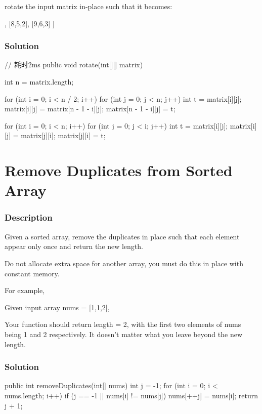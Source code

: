rotate the input matrix in-place such that it becomes:
\begin{Code}
[
  [7,4,1],
  [8,5,2],
  [9,6,3]
]
\end{Code}

\subsubsection{Solution}

\begin{Code}
// 耗时2ms
public void rotate(int[][] matrix) {
    int n = matrix.length;

    for (int i = 0; i < n / 2; i++) {
        for (int j = 0; j < n; j++) {
            int t = matrix[i][j];
            matrix[i][j] = matrix[n - 1 - i][j];
            matrix[n - 1 - i][j] = t;
        }
    }

    for (int i = 0; i < n; i++) {
        for (int j = 0; j < i; j++) {
            int t = matrix[i][j];
            matrix[i][j] = matrix[j][i];
            matrix[j][i] = t;
        }
    }
}
\end{Code}

\newpage

\section{Remove Duplicates from Sorted Array} %

\subsubsection{Description}
Given a sorted array, remove the duplicates in place such that each element appear only once and return the new length.

Do not allocate extra space for another array, you must do this in place with constant memory.

For example,

Given input array nums = [1,1,2],

Your function should return length = 2, with the first two elements of nums being 1 and 2 respectively. It doesn't matter what you leave beyond the new length.

\subsubsection{Solution}

\begin{Code}
public int removeDuplicates(int[] nums) {
    int j = -1;
    for (int i = 0; i < nums.length; i++) {
        if (j == -1 || nums[i] != nums[j]) {
            nums[++j] = nums[i];
        }
    }
    return j + 1;
}
\end{Code}

